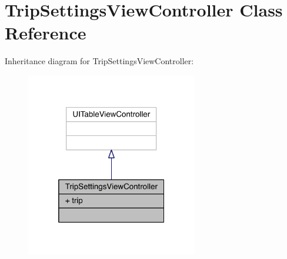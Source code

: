 \hypertarget{interface_trip_settings_view_controller}{\section{Trip\-Settings\-View\-Controller Class Reference}
\label{interface_trip_settings_view_controller}
}


Inheritance diagram for Trip\-Settings\-View\-Controller\-:\nopagebreak
\begin{figure}[H]
\begin{center}
\leavevmode
\includegraphics[width=212pt]{interface_trip_settings_view_controller__inherit__graph}
\end{center}
\end{figure}


